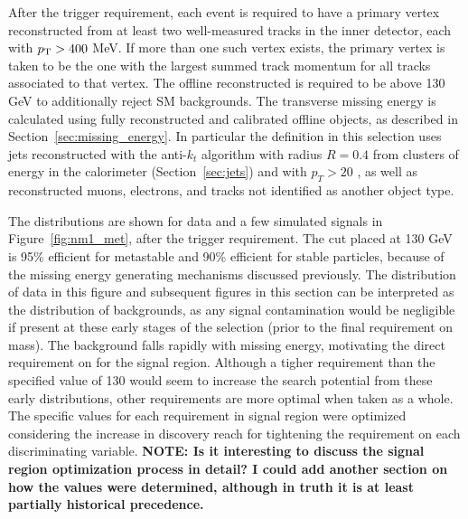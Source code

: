 After the trigger requirement, each event is required to have a primary vertex reconstructed from at least two well-measured tracks in the inner detector, each with $p_{\mathrm{T}} > 400$ MeV. 
If more than one such vertex exists, the primary vertex is taken to be the one with the largest summed track momentum for all tracks associated to that vertex. 
The offline reconstructed \met is required to be above 130 GeV to additionally reject \ac{SM} backgrounds.
The transverse missing energy is calculated using fully reconstructed and calibrated offline objects, as described in Section~\ref{sec:missing_energy}. 
In particular the \met definition in this selection uses jets reconstructed with the anti-$k_t$ algorithm with radius $R = 0.4$ from clusters of energy in the calorimeter (Section~\ref{sec:jets}) and with $p_T > 20$ \GeV, as well as reconstructed muons, electrons, and tracks not identified as another object type.

The \met distributions are shown for data and a few simulated signals in Figure~\ref{fig:nm1_met}, after the trigger requirement.
The cut placed at 130 GeV is 95\% efficient for metastable and 90\% efficient for stable particles, because of the missing energy generating mechanisms discussed previously.
The distribution of data in this figure and subsequent figures in this section can be interpreted as the distribution of backgrounds, as any signal contamination would be negligible if present at these early stages of the selection (prior to the final requirement on mass). 
The background falls rapidly with missing energy, motivating the direct requirement on \met for the signal region.
Although a tigher requirement than the specified value of 130 \GeV would seem to increase the search potential from these early distributions, other requirements are more optimal when taken as a whole.
The specific values for each requirement in signal region were optimized considering the increase in discovery reach for tightening the requirement on each discriminating variable. \textbf{NOTE: Is it interesting to discuss the signal region optimization process in detail? I could add another section on how the values were determined, although in truth it is at least partially historical precedence.}

